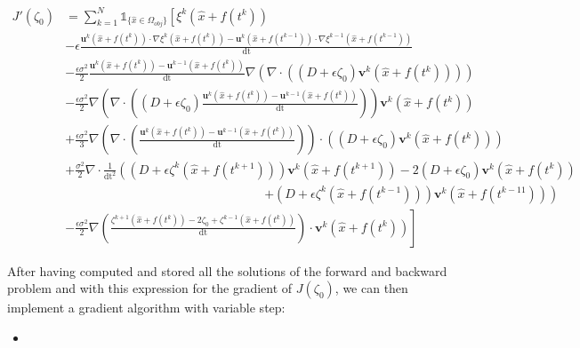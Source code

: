 \documentclass[11pt,a4paper]{article}
\begin{document}
		\begin{equation*}
			\begin{split}
				J'(\zeta_0) &= \sum^{N}_{k=1} \mathds{1}_{\{\hat{x} \in \Omega_{obj}\}} \left[ \xi^k(\hat{x} + f(t^k)) \right.\\
				&  - \epsilon \frac{\mathbf{u}^k(\hat{x} + f(t^k)) \cdot \nabla \xi^k(\hat{x} + f(t^{k})) - \mathbf{u}^k(\hat{x} + f(t^{k-1})) \cdot \nabla \xi^{k-1}(\hat{x} + f(t^{k-1}))}{\mathrm{dt}} \\
				&  - \frac{\epsilon \sigma^2}{2}  \frac{\mathbf{u}^k(\hat{x} + f(t^k)) - \mathbf{u}^{k-1}(\hat{x} + f(t^k))}{\mathrm{dt}}  \nabla\left( \nabla \cdot \left( (D + \epsilon \zeta_0) \mathbf{v}^k(\hat{x} + f(t^k)) \right) \right)\\
				&  - \frac{\epsilon \sigma^2}{2} \nabla \left( \nabla \cdot \left((D+\epsilon \zeta_0)\frac{\mathbf{u}^k(\hat{x} + f(t^k)) - \mathbf{u}^{k-1}(\hat{x} + f(t^k))}{\mathrm{dt}}\right) \right)  \mathbf{v}^k(\hat{x} + f(t^k))  \\
				& + \frac{\epsilon \sigma^2}{3} \nabla \left( \nabla \cdot \left( \frac{\mathbf{u}^k(\hat{x} + f(t^k)) - \mathbf{u}^{k-1}(\hat{x} + f(t^k))}{\mathrm{dt}} \right) \right) \cdot \left(  (D + \epsilon \zeta_0) \mathbf{v}^k(\hat{x} + f(t^k)) \right) \\
				&  + \frac{\sigma^2}{2} \nabla \cdot \frac{1}{\mathrm{dt}^2} \left( (D + \epsilon \zeta^k(\hat{x} + f(t^{k+1}))) \mathbf{v}^k(\hat{x} + f(t^{k+1})) -2(D + \epsilon \zeta_0) \mathbf{v}^k(\hat{x} + f(t^{k})) \right. \\
				& \qquad \qquad \qquad \qquad \qquad \qquad \qquad \qquad  \left. + (D + \epsilon \zeta^k(\hat{x} + f(t^{k-1}))) \mathbf{v}^k(\hat{x} + f(t^{k-11}))\right)\\
				& \left. - \frac{\epsilon \sigma^2}{2} \nabla  \left(\frac{\zeta^{k+1}(\hat{x} + f(t^k)) - 2\zeta_0 + \zeta^{k-1}(\hat{x} + f(t^k))}{\mathrm{dt}} \right) \cdot \mathbf{v}^k(\hat{x} + f(t^k)) \right]
			\end{split}
		\end{equation*}
		
		After having computed and stored all the solutions of the forward and backward problem and with this expression for the gradient of $J(\zeta_0)$, we can then implement a gradient algorithm with variable step:
		\begin{itemize}
			\item 
		\end{itemize}
		
		
\end{document}
